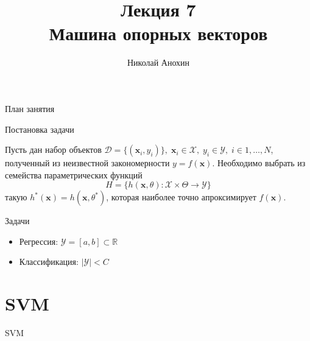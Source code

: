 \documentclass[10pt]{beamer}
\author{Николай Анохин}
\title{\newline \newline \newline Лекция 7 \\ Машина опорных векторов}
\let\otp\titlepage
\renewcommand{\titlepage}{\otp\addtocounter{framenumber}{-1}}
\begin{document}
\begin{frame}[plain]
\titlepage
\end{frame}

\begin{frame}{План занятия}
\tableofcontents
\end{frame}

\begin{frame}{Постановка задачи}

Пусть дан набор объектов $\mathcal{D} = \{(\mathbf{x}_i, y_i)\},
\; \mathbf{x}_i \in \mathcal{X},
\; y_i \in \mathcal{Y},
\; i \in 1, \ldots, N$, полученный из неизвестной закономерности $y = f(\mathbf{x})$. Необходимо выбрать из семейства параметрических функций
\[
H = \{h(\mathbf{x}, \theta): \mathcal{X} \times \Theta \rightarrow \mathcal{Y} \}
\]
такую $h^*(\mathbf{x}) = h(\mathbf{x}, \theta^*)$, которая наиболее точно апроксимирует $f(\mathbf{x})$.

\vspace{1em}
Задачи
\begin{itemize}
\item Регрессия: $\mathcal{Y} = [a, b] \subset \mathbb{R}$
\item Классификация: $|\mathcal{Y}| < C$
\end{itemize}

\end{frame}


\section{SVM}


\begin{frame}{}

\begin{center}
\Large SVM
\end{center}

\end{frame}
\end{document}
